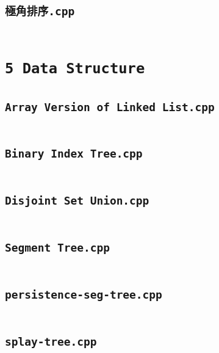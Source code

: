 \subsection*{\texttt{極角排序.cpp}} \label{sec:4_4_Geometry_file14}
\inputminted[fontsize=\footnotesize, linenos, breaklines]{cpp}{./4\ Geometry/極角排序.cpp}

\section*{\texttt{5 Data Structure}} \label{sec:5_5_Data_Structure}
\subsection*{\texttt{Array Version of Linked List.cpp}} \label{sec:5_5_Data_Structure_file0}
\inputminted[fontsize=\footnotesize, linenos, breaklines]{cpp}{./5\ Data\ Structure/Array\ Version\ of\ Linked\ List.cpp}

\subsection*{\texttt{Binary Index Tree.cpp}} \label{sec:5_5_Data_Structure_file1}
\inputminted[fontsize=\footnotesize, linenos, breaklines]{cpp}{./5\ Data\ Structure/Binary\ Index\ Tree.cpp}

\subsection*{\texttt{Disjoint Set Union.cpp}} \label{sec:5_5_Data_Structure_file2}
\inputminted[fontsize=\footnotesize, linenos, breaklines]{cpp}{./5\ Data\ Structure/Disjoint\ Set\ Union.cpp}

\subsection*{\texttt{Segment Tree.cpp}} \label{sec:5_5_Data_Structure_file3}
\inputminted[fontsize=\footnotesize, linenos, breaklines]{cpp}{./5\ Data\ Structure/Segment\ Tree.cpp}

\subsection*{\texttt{persistence-seg-tree.cpp}} \label{sec:5_5_Data_Structure_file4}
\inputminted[fontsize=\footnotesize, linenos, breaklines]{cpp}{./5\ Data\ Structure/persistence-seg-tree.cpp}

\subsection*{\texttt{splay-tree.cpp}} \label{sec:5_5_Data_Structure_file5}
\inputminted[fontsize=\footnotesize, linenos, breaklines]{cpp}{./5\ Data\ Structure/splay-tree.cpp}

